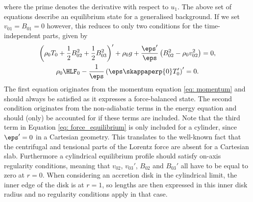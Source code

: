 where the prime denotes the derivative with respect to $u_1$. The above set of equations describe an equilibrium state for a generalised background. If we set $v_{01} = B_{01} = 0$ however, this reduces to only two conditions for the time-independent parts, given by
\begin{gather}
  \left(\rho_0 T_0 + \frac{1}{2}B_{02}^2 + \frac{1}{2}B_{03}^2\right)'
    + \rho_0 g
    + \frac{\eps'}{\eps}\left(B_{02}^2 - \rho_0 v_{02}^2\right) = 0, \label{eq: force_equilibrium} \\
  \rho_0 \HLF_0 - \frac{1}{\eps}\left(\eps \skappaperp{0} T_0'\right)' = 0. \label{eq: thermal_equilibrium}
\end{gather}
The first equation originates from the momentum equation \eqref{eq: momentum} and should always be satisfied as it expresses a force-balanced state. The second condition originates from the non-adiabatic terms in the energy equation and should (only) be accounted for if these terms are included. Note that the third term in Equation \eqref{eq: force_equilibrium} is only included for a cylinder, since $\eps' = 0$ in a Cartesian geometry. This translates to the well-known fact that the centrifugal and tensional parts of the Lorentz force are absent for a Cartesian slab. Furthermore a cylindrical equilibrium profile should satisfy on-axis regularity conditions, meaning that $v_{02}$, $v_{03}'$, $B_{02}$ and $B_{03}'$ all have to be equal to zero at $r = 0$. When considering an accretion disk in the cylindrical limit, the inner edge of the disk is at $r = 1$, so lengths are then expressed in this inner disk radius and no regularity conditions apply in that case.


